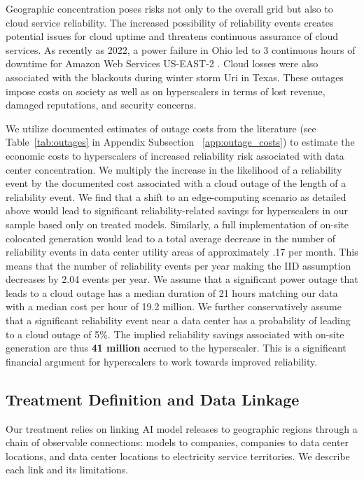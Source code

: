 \documentclass[sigconf]{acmart}
\begin{document}
Geographic concentration poses risks not only to the overall grid but also to cloud service reliability. The increased possibility of reliability events creates potential issues for cloud uptime and threatens continuous assurance of cloud services. As recently as 2022, a power failure in Ohio led to 3 continuous hours of downtime for Amazon Web Services US-EAST-2 \citep{Eisenberg2025AWSOutage}. Cloud losses were also associated with the blackouts during winter storm Uri in Texas. These outages impose costs on society as well as on hyperscalers in terms of lost revenue, damaged reputations, and security concerns.

We utilize documented estimates of outage costs from the literature (see Table~\ref{tab:outages} in Appendix Subsection ~\ref{app:outage_costs}) to estimate the economic costs to hyperscalers of increased reliability risk associated with data center concentration. We multiply the increase in the likelihood of a reliability event by the documented cost associated with a cloud outage of the length of a reliability event. We find that a shift to an edge-computing scenario as detailed above would lead to significant reliability-related savings for hyperscalers in our sample based only on treated models. Similarly, a full implementation of on-site colocated generation would lead to a total average decrease in the number of reliability events in data center utility areas of approximately .17 per month. This means that the number of reliability events per year making the IID assumption decreases by 2.04 events per year. We assume that a significant power outage that leads to a cloud outage has a median duration of 21 hours matching our data with a median cost per hour of 19.2 million. We further conservatively assume that a significant reliability event near a data center has a probability of leading to a cloud outage of 5\%. The implied reliability savings associated with on-site generation are thus \textbf{41 million} accrued to the hyperscaler. This is a significant financial argument for hyperscalers to work towards improved reliability.

\subsection{Treatment Definition and Data Linkage}
\label{subsec:treatment}

Our treatment relies on linking AI model releases to geographic regions through a chain of observable connections: models to companies, companies to data center locations, and data center locations to electricity service territories. We describe each link and its limitations.
\end{document}
